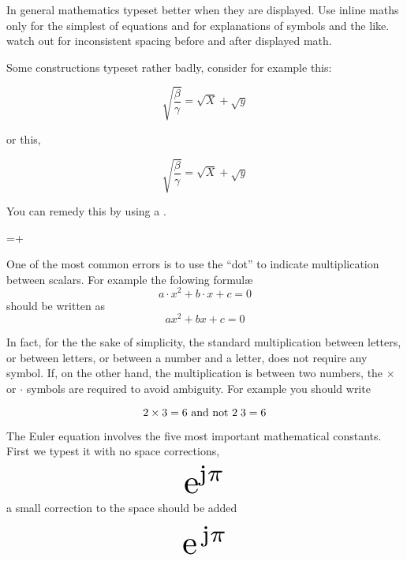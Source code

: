{


In general mathematics typeset better when they are displayed. Use inline maths only for the simplest of equations and for explanations of symbols and the like. watch out for inconsistent spacing before and after displayed math.


Some \tex constructions typeset rather badly, consider for example this:

\[
\sqrt{\frac{\beta}{\gamma}} = \sqrt{X} + \sqrt{y}
\]

\noindent or this,

\[
\surd{\frac{\beta}{\gamma}} = \surd{X} + \surd{y}
\]


You can remedy this by using a .


\begin{teXX}
=+
\end{teXX}


One of the most common errors is to use the ``dot'' to indicate multiplication between scalars. For example the folowing formul\ae
\[a\cdot x^2+b\cdot x+c=0\]
should be written as
\[ax^2+bx+c=0\]

In fact, for the the sake of simplicity, the standard multiplication between letters, or between letters, or between a number and a letter, does not require any symbol. If, on the other hand, the multiplication is between two numbers, the $\times$ or $\cdot$ symbols are required to avoid ambiguity.
For example you should write

\[2\times 3=6 \text{ and not } 2\thickspace 3=6 \]



The Euler equation involves the five most important mathematical constants. First we typest it with no space corrections,
\providecommand*{\eu}%
{\ensuremath{\mathrm{e}}}
\providecommand*{\iu}%
{\ensuremath{\mathrm{j}}}
\[\scalebox{3}{$\eu^{\iu\pi}$}\]
a small correction to the space should be added

\[\scalebox{3}{$\eu^{\,\iu\pi}$}\]

}
